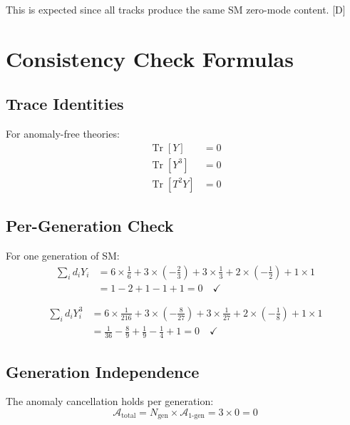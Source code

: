 \documentclass[11pt,a4paper]{article}
\newcommand{\tagD}{\textcolor{blue!70!black}{[D]}}
\DeclareMathOperator{\Tr}{Tr}
\begin{document}
This is expected since all tracks produce the same SM zero-mode content. \tagD

\section{Consistency Check Formulas}
\label{app:consistency}

\subsection{Trace Identities}

For anomaly-free theories:
\begin{align}
\label{eq:trace-Y}
\Tr[Y] &= 0 \\
\label{eq:trace-Y3}
\Tr[Y^3] &= 0 \\
\label{eq:trace-T2Y}
\Tr[T^2 Y] &= 0
\end{align}

\subsection{Per-Generation Check}

For one generation of SM:
\begin{align}
\label{eq:gen-Y}
\sum_i d_i Y_i &= 6 \times \frac{1}{6} + 3 \times (-\frac{2}{3}) + 3 \times \frac{1}{3} + 2 \times (-\frac{1}{2}) + 1 \times 1 \\
\label{eq:gen-Y-eval}
&= 1 - 2 + 1 - 1 + 1 = 0 \quad \checkmark
\end{align}

\begin{align}
\label{eq:gen-Y3}
\sum_i d_i Y_i^3 &= 6 \times \frac{1}{216} + 3 \times (-\frac{8}{27}) + 3 \times \frac{1}{27} + 2 \times (-\frac{1}{8}) + 1 \times 1 \\
\label{eq:gen-Y3-eval}
&= \frac{1}{36} - \frac{8}{9} + \frac{1}{9} - \frac{1}{4} + 1 = 0 \quad \checkmark
\end{align}

\subsection{Generation Independence}

The anomaly cancellation holds per generation:
\begin{equation}
\label{eq:gen-indep}
\mathcal{A}_{\text{total}} = N_{\text{gen}} \times \mathcal{A}_{\text{1-gen}} = 3 \times 0 = 0
\end{equation}
\end{document}
